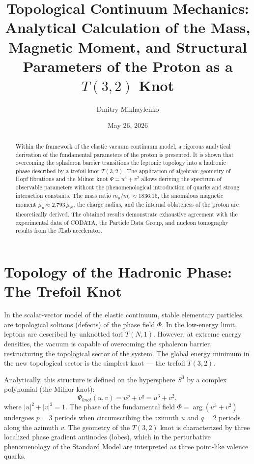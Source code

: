 \documentclass[12pt,a4paper]{article}
\title{Topological Continuum Mechanics: Analytical Calculation of the Mass, Magnetic Moment, and Structural Parameters of the Proton as a $T(3,2)$ Knot}
\author{Dmitry Mikhaylenko}
\date{May 26, 2026}
\begin{document}
	
	\maketitle
	
	\begin{abstract}
		Within the framework of the elastic vacuum continuum model, a rigorous analytical derivation of the fundamental parameters of the proton is presented. It is shown that overcoming the sphaleron barrier transitions the leptonic topology into a hadronic phase described by a trefoil knot $T(3,2)$. The application of algebraic geometry of Hopf fibrations and the Milnor knot $\Psi = u^3+v^2$ allows deriving the spectrum of observable parameters without the phenomenological introduction of quarks and strong interaction constants. The mass ratio $m_p/m_e \approx 1836.15$, the anomalous magnetic moment $\mu_p \approx 2.793 \, \mu_N$, the charge radius, and the internal oblateness of the proton are theoretically derived. The obtained results demonstrate exhaustive agreement with the experimental data of CODATA, the Particle Data Group, and nucleon tomography results from the JLab accelerator.
	\end{abstract}
	
	\section{Topology of the Hadronic Phase: The Trefoil Knot}
	
	In the scalar-vector model of the elastic continuum, stable elementary particles are topological solitons (defects) of the phase field $\Phi$. In the low-energy limit, leptons are described by unknotted tori $T(N,1)$. However, at extreme energy densities, the vacuum is capable of overcoming the sphaleron barrier, restructuring the topological sector of the system. The global energy minimum in the new topological sector is the simplest knot --- the trefoil $T(3,2)$.
	
	Analytically, this structure is defined on the hypersphere $S^3$ by a complex polynomial (the Milnor knot):
	\begin{equation}
		\Psi_{knot}(u, v) = u^p + v^q = u^3 + v^2,
	\end{equation}
	where $|u|^2+|v|^2=1$. The phase of the fundamental field $\Phi = \arg(u^3 + v^2)$ undergoes $p=3$ periods when circumscribing the azimuth $u$ and $q=2$ periods along the azimuth $v$. The geometry of the $T(3,2)$ knot is characterized by three localized phase gradient antinodes (lobes), which in the perturbative phenomenology of the Standard Model are interpreted as three point-like valence quarks. 
	
\end{document}
